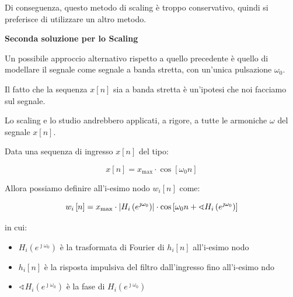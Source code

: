 Di conseguenza, questo metodo di scaling è troppo conservativo, quindi si preferisce di utilizzare un altro metodo. \newline 

\textbf{Seconda soluzione per lo Scaling} \newline 

Un possibile approccio alternativo rispetto a quello precedente è quello di modellare il segnale come segnale a banda stretta, 
con un'unica pulsazione $\omega_0$. \newline 

\begin{tcolorbox}
Il fatto che la sequenza $x \left[ n\right]$ sia a banda stretta è un'ipotesi che noi facciamo sul segnale. \newline 

Lo scaling e lo studio andrebbero applicati, a rigore, a tutte le armoniche $\omega$ del segnale $x \left[ n\right]$. 
\end{tcolorbox}

Data una sequenza di ingresso $x \left[ n\right]$ del tipo: 

{
    \Large 
    \begin{equation}
        x \left[ n\right] 
        = 
        x_{\text{max}} \cdot \cos \left[ \omega_0 n\right]
    \end{equation}
}

Allora possiamo definire all'i-esimo nodo $w_{i} \left[ n\right]$ come: 

{
    \Large 
    \begin{equation}
        w_{i} \left[ n\right] 
        = 
        x_{\text{max}} 
        \cdot 
        \abs{H_{i} \left(e^{\jmath \omega_0}\right)}
        \cdot 
        \cos \left[ \omega_0 n + \sphericalangle  H_{i} \left(e^{\jmath \omega_0}\right)\right]
    \end{equation}
}

in cui: 

\begin{itemize}
    \item $H_{i} \left(e^{\jmath \omega_0}\right)$ è la trasformata di Fourier di $h_{i} \left[ n\right]$ all'i-esimo nodo 
    \item $h_{i} \left[ n\right]$ è la risposta impulsiva del filtro dall'ingresso fino all'i-esimo ndo 
    \item $\sphericalangle  H_{i} \left(e^{\jmath \omega_0}\right)$ è la fase di $H_{i} \left(e^{\jmath \omega_0}\right)$
\end{itemize} 

